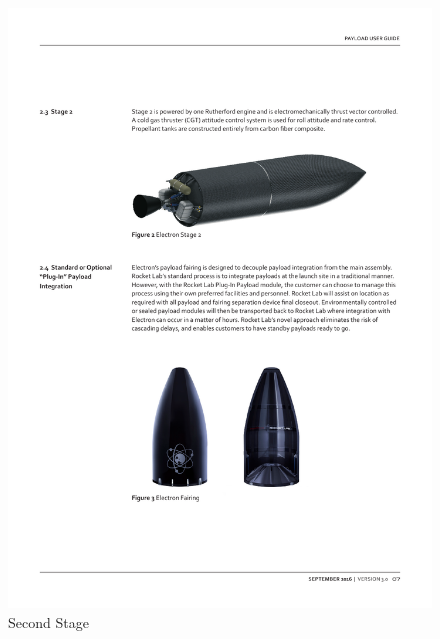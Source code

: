 \begin{figure}[H]
\centering 
\includegraphics[scale=0.6]{./sections/Constellation_Deployment/S2-Launcher/Images_S2/Picture_2_S2.pdf} 
\caption{Second Stage}
\label{fig:second}
\end{figure}

